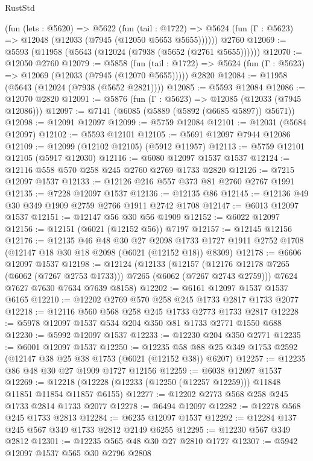 \begin{lexlean}{RustStd}
\begin{coremodule}
    (fun (lets : @5620) =>
    @5622
      (fun (tail : @1722) =>
      @5624 (fun (Γ : @5623) => @12048 (@12033 (@7945 (@12050 @5653 @5655))))))
    @2760
@12069 := @5593 (@11958 (@5643 (@12024 (@7938 (@5652 (@2761 @5655))))))
@12070 := @12050 @2760
@12079 := @5858
    (fun (tail : @1722) => @5624 (fun (Γ : @5623) => @12069 (@12033 (@7945 (@12070 @5655)))))
    @2820
@12084 := @11958 (@5643 (@12024 (@7938 (@5652 @2821))))
@12085 := @5593 @12084
@12086 := @12070 @2820
@12091 := @5876 (fun (Γ : @5623) => @12085 (@12033 (@7945 @12086)))
@12097 := @7141 (@6085 (@5889 (@5892 (@6685 @5897)) @5671))
@12098 := @12091 @12097
@12099 := @5759 @12084
@12101 := @12031 (@5684 @12097)
@12102 := @5593 @12101
@12105 := @5691 @12097 @7944 @12086
@12109 := @12099 (@12102 @12105) (@5912 @11957)
@12113 := @5759 @12101 @12105 (@5917 @12030)
@12116 := @6080 @12097 @1537 @1537
@12124 := @12116 @558 @570 @258 @245 @2760 @2769 @1733 @2820
@12126 := @7215 @12097 @1537
@12133 := @12126 @216 @557 @373 @81 @2760 @2767 @1991
@12135 := @7228 @12097 @1537
@12136 := @12135 @86
@12145 := @12136 @49 @30 @349 @1909 @2759 @2766 @1911 @2742 @1708
@12147 := @6013 @12097 @1537
@12151 := @12147 @56 @30 @56 @1909
@12152 := @6022 @12097
@12156 := @12151 (@6021 (@12152 @56)) @7197
@12157 := @12145 @12156
@12176 := @12135
    @46
    @48
    @30
    @27
    @2098
    @1733
    @1727
    @1911
    @2752
    @1708
    (@12147 @18 @30 @18 @2098 (@6021 (@12152 @18)) @8309)
@12178 := @6606 @12097 @1537
@12198 := @12124
    (@12133
      (@12157 (@12176 @12178 @7265 (@6062 (@7267 @2753 @1733))) @7265 (@6062 (@7267 @2743 @2759)))
      @7624
      @7627
      @7630
      @7634
      @7639
      @8158)
@12202 := @6161 @12097 @1537 @1537 @6165
@12210 := @12202 @2769 @570 @258 @245 @1733 @2817 @1733 @2077
@12218 := @12116 @560 @568 @258 @245 @1733 @2773 @1733 @2817
@12228 := @5978 @12097 @1537 @534 @204 @350 @81 @1733 @2771 @1550 @688
@12230 := @5992 @12097 @1537
@12233 := @12230 @204 @350 @2771
@12235 := @6001 @12097 @1537
@12250 := @12235 @58 @88 @25 @349 @1753 @2592 (@12147 @38 @25 @38 @1753 (@6021 (@12152 @38)) @6207)
@12257 := @12235 @86 @48 @30 @27 @1909 @1727 @12156
@12259 := @6038 @12097 @1537
@12269 := @12218 (@12228 (@12233 (@12250 (@12257 @12259))) @11848 @11851 @11854 @11857 @6155)
@12277 := @12202 @2773 @568 @258 @245 @1733 @2814 @1733 @2077
@12278 := @6494 @12097
@12282 := @12278 @568 @245 @1733 @2813
@12284 := @6235 @12097 @1537
@12292 := @12284 @137 @245 @567 @349 @1733 @2812 @2149 @6255
@12295 := @12230 @567 @349 @2812
@12301 := @12235 @565 @48 @30 @27 @2810 @1727
@12307 := @5942 @12097 @1537 @565 @30 @2796 @2808

\end{coremodule}
\end{lexlean}
